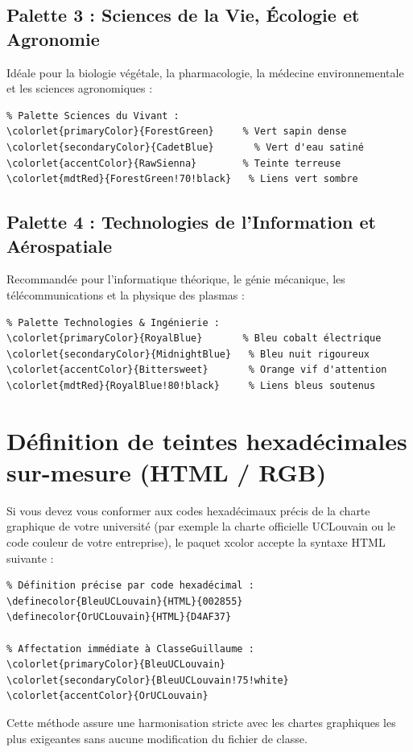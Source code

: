 \subsection{Palette 3 : Sciences de la Vie, Écologie et Agronomie}
Idéale pour la biologie végétale, la pharmacologie, la médecine environnementale et les sciences agronomiques :
\begin{verbatim}
% Palette Sciences du Vivant :
\colorlet{primaryColor}{ForestGreen}     % Vert sapin dense
\colorlet{secondaryColor}{CadetBlue}       % Vert d'eau satiné
\colorlet{accentColor}{RawSienna}        % Teinte terreuse
\colorlet{mdtRed}{ForestGreen!70!black}   % Liens vert sombre
\end{verbatim}

\subsection{Palette 4 : Technologies de l'Information et Aérospatiale}
Recommandée pour l'informatique théorique, le génie mécanique, les télécommunications et la physique des plasmas :
\begin{verbatim}
% Palette Technologies & Ingénierie :
\colorlet{primaryColor}{RoyalBlue}       % Bleu cobalt électrique
\colorlet{secondaryColor}{MidnightBlue}   % Bleu nuit rigoureux
\colorlet{accentColor}{Bittersweet}       % Orange vif d'attention
\colorlet{mdtRed}{RoyalBlue!80!black}     % Liens bleus soutenus
\end{verbatim}

\section{Définition de teintes hexadécimales sur-mesure (HTML / RGB)}
\label{sec:couleurs_hexadecimales}

Si vous devez vous conformer aux codes hexadécimaux précis de la charte graphique de votre université (par exemple la charte officielle UCLouvain ou le code couleur de votre entreprise), le paquet \textsf{xcolor} accepte la syntaxe HTML suivante :

\begin{verbatim}
% Définition précise par code hexadécimal :
\definecolor{BleuUCLouvain}{HTML}{002855}
\definecolor{OrUCLouvain}{HTML}{D4AF37}

% Affectation immédiate à ClasseGuillaume :
\colorlet{primaryColor}{BleuUCLouvain}
\colorlet{secondaryColor}{BleuUCLouvain!75!white}
\colorlet{accentColor}{OrUCLouvain}
\end{verbatim}
Cette méthode assure une harmonisation stricte avec les chartes graphiques les plus exigeantes sans aucune modification du fichier de classe.

